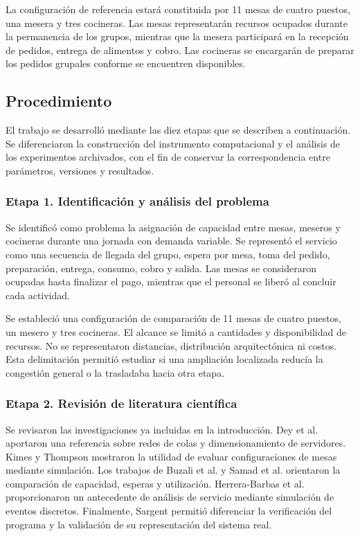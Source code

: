 \documentclass[10pt,a4paper,twocolumn]{article}
\begin{document}
La configuración de referencia estará constituida por 11 mesas de cuatro puestos, una mesera y tres cocineras. Las mesas representarán recursos ocupados durante la permanencia de los grupos, mientras que la mesera participará en la recepción de pedidos, entrega de alimentos y cobro. Las cocineras se encargarán de preparar los pedidos grupales conforme se encuentren disponibles.

\subsection{Procedimiento}

El trabajo se desarrolló mediante las diez etapas que se describen a continuación. Se diferenciaron la construcción del instrumento computacional y el análisis de los experimentos archivados, con el fin de conservar la correspondencia entre parámetros, versiones y resultados.

\subsubsection*{Etapa 1. Identificación y análisis del problema}

Se identificó como problema la asignación de capacidad entre mesas, meseros y cocineras durante una jornada con demanda variable. Se representó el servicio como una secuencia de llegada del grupo, espera por mesa, toma del pedido, preparación, entrega, consumo, cobro y salida. Las mesas se consideraron ocupadas hasta finalizar el pago, mientras que el personal se liberó al concluir cada actividad.

Se estableció una configuración de comparación de 11 mesas de cuatro puestos, un mesero y tres cocineras. El alcance se limitó a cantidades y disponibilidad de recursos. No se representaron distancias, distribución arquitectónica ni costos. Esta delimitación permitió estudiar si una ampliación localizada reducía la congestión general o la trasladaba hacia otra etapa.

\subsubsection*{Etapa 2. Revisión de literatura científica}

Se revisaron las investigaciones ya incluidas en la introducción. Dey et al. \cite{ref2} aportaron una referencia sobre redes de colas y dimensionamiento de servidores. Kimes y Thompson \cite{ref4} mostraron la utilidad de evaluar configuraciones de mesas mediante simulación. Los trabajos de Buzali et al. \cite{ref8} y Samad et al. \cite{ref9} orientaron la comparación de capacidad, esperas y utilización. Herrera-Barbas et al. \cite{ref10} proporcionaron un antecedente de análisis de servicio mediante simulación de eventos discretos. Finalmente, Sargent \cite{ref3} permitió diferenciar la verificación del programa y la validación de su representación del sistema real.
\end{document}
